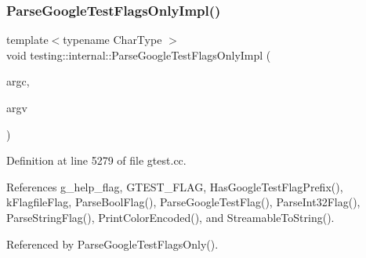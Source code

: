 \subsubsection{\texorpdfstring{Parse\+Google\+Test\+Flags\+Only\+Impl()}{ParseGoogleTestFlagsOnlyImpl()}}
{\footnotesize\ttfamily template$<$typename Char\+Type $>$ \\
void testing\+::internal\+::\+Parse\+Google\+Test\+Flags\+Only\+Impl (\begin{DoxyParamCaption}\item[{int $\ast$}]{argc,  }\item[{Char\+Type $\ast$$\ast$}]{argv }\end{DoxyParamCaption})}



Definition at line 5279 of file gtest.\+cc.



References g\+\_\+help\+\_\+flag, G\+T\+E\+S\+T\+\_\+\+F\+L\+AG, Has\+Google\+Test\+Flag\+Prefix(), k\+Flagfile\+Flag, Parse\+Bool\+Flag(), Parse\+Google\+Test\+Flag(), Parse\+Int32\+Flag(), Parse\+String\+Flag(), Print\+Color\+Encoded(), and Streamable\+To\+String().



Referenced by Parse\+Google\+Test\+Flags\+Only().


